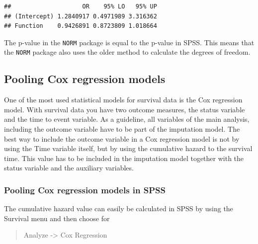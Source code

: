 \documentclass[
]{book}
\begin{document}
\begin{verbatim}
##                    OR    95% LO   95% UP
## (Intercept) 1.2840917 0.4971989 3.316362
## Function    0.9426891 0.8723809 1.018664
\end{verbatim}

The p-value in the \texttt{NORM} package is equal to the p-value in SPSS. This means that the \texttt{NORM} package also uses the older method to calculate the degrees of freedom.

\hypertarget{pooling-cox-regression-models}{%
\subsection{Pooling Cox regression models}\label{pooling-cox-regression-models}}

One of the most used statistical models for survival data is the Cox regression model. With survival data you have two outcome measures, the status variable and the time to event variable. As a guideline, all variables of the main analysis, including the outcome variable have to be part of the imputation model. The best way to include the outcome variable in a Cox regression model is not by using the Time variable itself, but by using the cumulative hazard to the survival time. This value has to be included in the imputation model together with the status variable and the auxiliary variables.

\hypertarget{pooling-cox-regression-models-in-spss}{%
\subsubsection{Pooling Cox regression models in SPSS}\label{pooling-cox-regression-models-in-spss}}

The cumulative hazard value can easily be calculated in SPSS by using the Survival menu and then choose for

\begin{quote}
Analyze -\textgreater{} Cox Regression
\end{quote}
\end{document}
